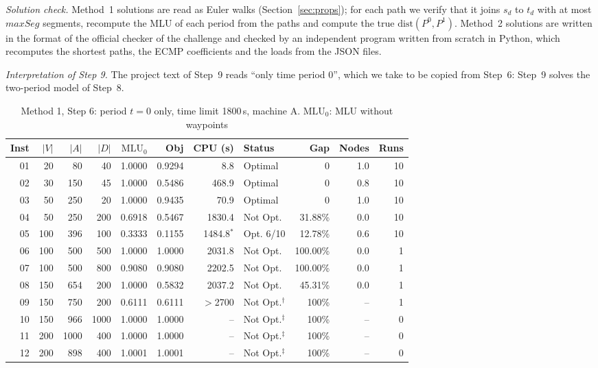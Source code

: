 \documentclass[conference]{IEEEtran}
\newcommand{\MLU}{\mathrm{MLU}}
\begin{document}
\emph{Solution check.} Method~1 solutions are read as Euler walks (Section~\ref{sec:props}); for each path we verify that it joins $s_d$ to $t_d$ with at most $maxSeg$ segments, recompute the MLU of each period from the paths and compute the true $\mathrm{dist}(P^0,P^1)$. Method~2 solutions are written in the format of the official checker of the challenge and checked by an independent program written from scratch in Python, which recomputes the shortest paths, the ECMP coefficients and the loads from the JSON files.

\emph{Interpretation of Step 9.} The project text of Step~9 reads ``only time period 0'', which we take to be copied from Step~6: Step~9 solves the two-period model of Step~8.

\begin{table}[t]
\centering\footnotesize
\caption{Method 1, Step 6: period $t=0$ only, time limit 1800\,s, machine A. $\MLU_0$: MLU without waypoints}\label{tab:step6}
\begin{tabular}{@{}rrrrrrrlrrr@{}}
\toprule
Inst & $|V|$ & $|A|$ & $|D|$ & $\MLU_0$ & Obj & CPU (s) & Status & Gap & Nodes & Runs\\
\midrule
01 & 20 & 80 & 40 & 1.0000 & 0.9294 & 8.8 & Optimal & 0 & 1.0 & 10\\
02 & 30 & 150 & 45 & 1.0000 & 0.5486 & 468.9 & Optimal & 0 & 0.8 & 10\\
03 & 50 & 250 & 20 & 1.0000 & 0.9435 & 70.9 & Optimal & 0 & 1.0 & 10\\
04 & 50 & 250 & 200 & 0.6918 & 0.5467 & 1830.4 & Not Opt. & 31.88\% & 0.0 & 10\\
05 & 100 & 396 & 100 & 0.3333 & 0.1155 & 1484.8$^*$ & Opt. 6/10 & 12.78\% & 0.6 & 10\\
06 & 100 & 500 & 500 & 1.0000 & 1.0000 & 2031.8 & Not Opt. & 100.00\% & 0.0 & 1\\
07 & 100 & 500 & 800 & 0.9080 & 0.9080 & 2202.5 & Not Opt. & 100.00\% & 0.0 & 1\\
08 & 150 & 654 & 200 & 1.0000 & 0.5832 & 2037.2 & Not Opt. & 45.31\% & 0.0 & 1\\
09 & 150 & 750 & 200 & 0.6111 & 0.6111 & $>$2700 & Not Opt.$^\dagger$ & 100\% & -- & 1\\
10 & 150 & 966 & 1000 & 1.0000 & 1.0000 & -- & Not Opt.$^\ddagger$ & 100\% & -- & 0\\
11 & 200 & 1000 & 400 & 1.0000 & 1.0000 & -- & Not Opt.$^\ddagger$ & 100\% & -- & 0\\
12 & 200 & 898 & 400 & 1.0001 & 1.0001 & -- & Not Opt.$^\ddagger$ & 100\% & -- & 0\\

\end{tabular}
\end{table}
\end{document}
